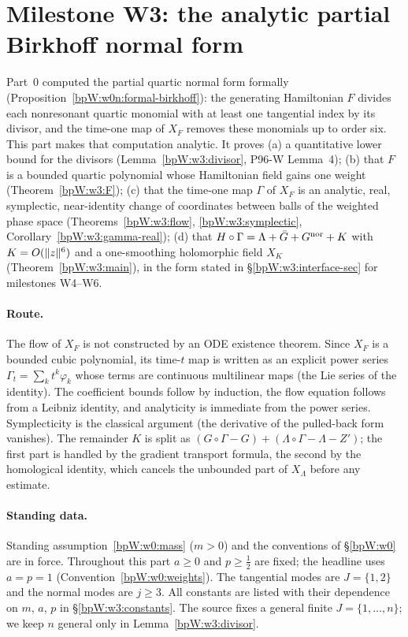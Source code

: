 \section{Milestone W3: the analytic partial Birkhoff normal form}\label{bpW:w3}

Part~0 computed the partial quartic normal form formally (Proposition~\ref{bpW:w0n:formal-birkhoff}): the
generating Hamiltonian $F$ divides each nonresonant quartic monomial with at least one tangential index by its
divisor, and the time-one map of $X_F$ removes these monomials up to order six. This part makes that computation
analytic. It proves
(a) a quantitative lower bound for the divisors (Lemma~\ref{bpW:w3:divisor}, P96-W Lemma~4);
(b) that $F$ is a bounded quartic polynomial whose Hamiltonian field gains one weight (Theorem~\ref{bpW:w3:F});
(c) that the time-one map $\Gamma$ of $X_F$ is an analytic, real, symplectic, near-identity change of coordinates
between balls of the weighted phase space (Theorems~\ref{bpW:w3:flow}, \ref{bpW:w3:symplectic},
Corollary~\ref{bpW:w3:gamma-real});
(d) that $H\circ\Gamma=\Lambda+\bar G+G^{\rm nor}+K$ with $K=O(\lVert z\rVert^6)$ and a one-smoothing holomorphic field
$X_K$ (Theorem~\ref{bpW:w3:main}), in the form stated in \S\ref{bpW:w3:interface-sec} for milestones W4--W6.

\paragraph{Route.} The flow of $X_F$ is not constructed by an ODE existence theorem. Since $X_F$ is a bounded
cubic polynomial, its time-$t$ map is written as an explicit power series $\Gamma_t=\sum_kt^k\varphi_k$ whose terms
are continuous multilinear maps (the Lie series of the identity). The coefficient bounds follow by induction, the
flow equation follows from a Leibniz identity, and analyticity is immediate from the power series. Symplecticity
is the classical argument (the derivative of the pulled-back form vanishes). The remainder $K$ is split as
$(G\circ\Gamma-G)+(\Lambda\circ\Gamma-\Lambda-Z')$; the first part is handled by the gradient transport formula,
the second by the homological identity, which cancels the unbounded part of $X_\Lambda$ before any estimate.

\paragraph{Standing data.} Standing assumption~\ref{bpW:w0:mass} ($m>0$) and the conventions of \S\ref{bpW:w0}
are in force. Throughout this part $a\ge0$ and $p\ge\frac12$ are fixed; the headline uses $a=p=1$
(Convention~\ref{bpW:w0:weights}). The tangential modes are $J=\{1,2\}$ and the normal modes are $j\ge3$. All
constants are listed with their dependence on $m$, $a$, $p$ in \S\ref{bpW:w3:constants}. The source fixes a
general finite $J=\{1,\dots,n\}$; we keep $n$ general only in Lemma~\ref{bpW:w3:divisor}.

